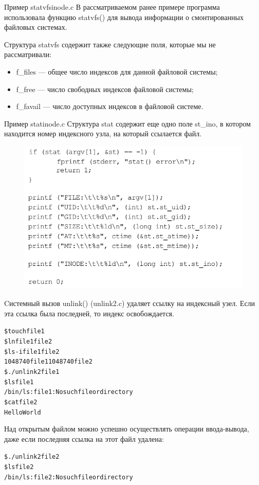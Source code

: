 \documentclass{beamer}
\begin{document}
\begin{frame}[fragile]{Пример statvfsinode.c}
В рассматриваемом ранее примере программа использовала функцию statvfs() для вывода информации о смонтированных файловых системах. 

Структура statvfs содержит также следующие поля, которые мы не рассматривали:
\begin{itemize}
\item f\_files — общее число индексов для данной файловой системы;
\item f\_free — число свободных индексов файловой системы;
\item f\_favail — число доступных индексов в файловой системе.
\end{itemize}
\end{frame}

\begin{frame}[fragile]{Пример statinode.c}
Структура stat содержит еще одно поле st\_ino, в котором находится номер индексного узла, на который ссылается файл.
\begin{figure}[h]
\centering
\includegraphics[scale=0.5]{images/lec10-pic01.png}
\end{figure}
\end{frame}

\begin{frame}[fragile]
Cистемный вызов unlink() (unlink2.c) удаляет ссылку на индексный узел. Если эта ссылка была последней, то индекс освобождается.
\begin{alltt}
\$ touch file1
\$ ln file1 file2
\$ ls -i file1 file2
1048740 file1 1048740 file2
\$ ./unlink2 file1
\$ ls file1
/bin/ls: file1: No such file or directory
\$ cat file2
Hello World
\end{alltt}
Над открытым файлом можно успешно осуществлять операции ввода-вывода, даже если последняя ссылка на этот файл удалена:
\begin{alltt}
\$ ./unlink2 file2
\$ ls file2
/bin/ls: file2: No such file or directory
\end{alltt}
\end{frame}
\end{document}
